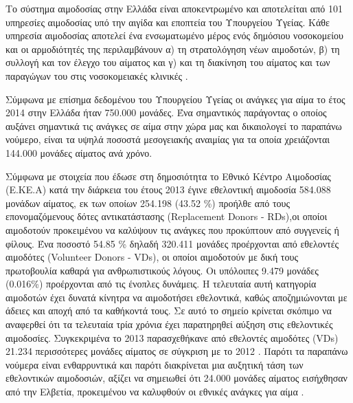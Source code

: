 		Το σύστημα αιμοδοσίας στην Ελλάδα είναι αποκεντρωμένο και αποτελείται από 101 υπηρεσίες αιμοδοσίας υπό την αιγίδα και εποπτεία του Υπουργείου Υγείας\cite{filloKivernisews}. Κάθε υπηρεσία αιμοδοσίας αποτελεί ένα ενσωματωμένο μέρος ενός δημόσιου νοσοκομείου και οι αρμοδιότητές της περιλαμβάνουν α) τη στρατολόγηση νέων αιμοδοτών, β) τη συλλογή και τον έλεγχο του αίματος και γ) και τη διακίνηση του αίματος και των παραγώγων του στις νοσοκομειακές κλινικές \cite{Marantidou2007}.
		
		Σύμφωνα με επίσημα δεδομένου του Υπουργείου Υγείας οι ανάγκες για αίμα το έτος 2014 στην Ελλάδα ήταν 750.000 μονάδες. Ένα σημαντικός παράγοντας ο οποίος αυξάνει σημαντικά τις ανάγκες σε αίμα στην χώρα μας και δικαιολογεί το παραπάνω νούμερο, είναι τα υψηλά ποσοστά μεσογειακής αναιμίας για τα οποία χρειάζονται 144.000 μονάδες αίματος ανά χρόνο. 
		
		Σύμφωνα με στοιχεία που έδωσε στη δημοσιότητα το Εθνικό Κέντρο Αιμοδοσίας (Ε.ΚΕ.Α) κατά την διάρκεια του έτους 2013 έγινε εθελοντική αιμοδοσία 584.088 μονάδων αίματος, εκ των οποίων 254.198 (43.52 \%) προήλθε από τους επονομαζόμενους δότες αντικατάστασης (Replacement Donors - RDs),οι οποίοι αιμοδοτούν προκειμένου να καλύψουν τις ανάγκες που προκύπτουν από συγγενείς ή φίλους. Ένα ποσοστό 54.85 \% δηλαδή 320.411 μονάδες προέρχονται από εθελοντές αιμοδότες (Volunteer Donors - VDs), οι οποίοι αιμοδοτούν με δική τους πρωτοβουλία καθαρά για ανθρωπιστικούς λόγους. Οι υπόλοιπες 9.479 μονάδες (0.016\%) προέρχονται από τις ένοπλες δυνάμεις. Η τελευταία αυτή κατηγορία αιμοδοτών έχει δυνατά κίνητρα να αιμοδοτήσει εθελοντικά, καθώς αποζημιώνονται με άδειες και αποχή από τα καθήκοντά τους. Σε αυτό το σημείο κρίνεται σκόπιμο να αναφερθεί ότι τα τελευταία τρία χρόνια έχει παρατηρηθεί αύξηση στις εθελοντικές αιμοδοσίες. Συγκεκριμένα το 2013 παρασχεθήκανε από εθελοντές αιμοδότες (VDs) 21.234 περισσότερες μονάδες αίματος σε σύγκριση με το 2012 \cite{EKEA}. Παρότι τα παραπάνω νούμερα είναι ενθαρρυντικά και παρότι διακρίνεται μια αυξητική τάση των εθελοντικών αιμοδοσιών, αξίζει να σημειωθεί ότι 24.000 μονάδες αίματος εισήχθησαν από την Ελβετία, προκειμένου να καλυφθούν οι εθνικές ανάγκες για αίμα \cite{Marantidou2007}.
		
